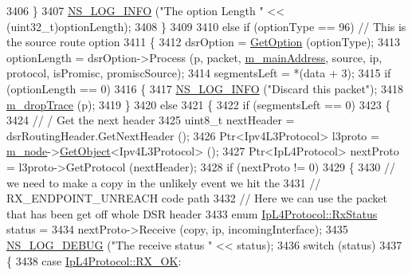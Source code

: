 \begin{DoxyCode}
3406         \}
3407       \hyperlink{group__logging_gafbd73ee2cf9f26b319f49086d8e860fb}{NS\_LOG\_INFO} (\textcolor{stringliteral}{"The option Length "} << (uint32\_t)optionLength);
3408     \}
3409 
3410   \textcolor{keywordflow}{else} \textcolor{keywordflow}{if} (optionType == 96)       \textcolor{comment}{// This is the source route option}
3411     \{
3412       dsrOption = \hyperlink{classns3_1_1dsr_1_1DsrRouting_a5cdb4c336831a3158c6ba12d226a198e}{GetOption} (optionType);
3413       optionLength = dsrOption->Process (p, packet, \hyperlink{classns3_1_1dsr_1_1DsrRouting_a73182b5edee2d8460f28855e058fc9a0}{m\_mainAddress}, source, ip, protocol, 
      isPromisc, promiscSource);
3414       segmentsLeft = *(data + 3);
3415       \textcolor{keywordflow}{if} (optionLength == 0)
3416         \{
3417           \hyperlink{group__logging_gafbd73ee2cf9f26b319f49086d8e860fb}{NS\_LOG\_INFO} (\textcolor{stringliteral}{"Discard this packet"});
3418           \hyperlink{classns3_1_1dsr_1_1DsrRouting_aacee2c8437c0b61579cfa7a420423e03}{m\_dropTrace} (p);
3419         \}
3420       \textcolor{keywordflow}{else}
3421         \{
3422           \textcolor{keywordflow}{if} (segmentsLeft == 0)
3423             \{
3424               \textcolor{comment}{// / Get the next header}
3425               uint8\_t nextHeader = dsrRoutingHeader.GetNextHeader ();
3426               Ptr<Ipv4L3Protocol> l3proto = \hyperlink{classns3_1_1dsr_1_1DsrRouting_ac27df0103a40973f0a3f78af0092c60d}{m\_node}->\hyperlink{classns3_1_1Object_a13e18c00017096c8381eb651d5bd0783}{GetObject}<Ipv4L3Protocol> ();
3427               Ptr<IpL4Protocol> nextProto = l3proto->GetProtocol (nextHeader);
3428               \textcolor{keywordflow}{if} (nextProto != 0)
3429                 \{
3430                   \textcolor{comment}{// we need to make a copy in the unlikely event we hit the}
3431                   \textcolor{comment}{// RX\_ENDPOINT\_UNREACH code path}
3432                   \textcolor{comment}{// Here we can use the packet that has been get off whole DSR header}
3433                   \textcolor{keyword}{enum} \hyperlink{classns3_1_1IpL4Protocol_afd3744c89902fff232e2fd45f558c80e}{IpL4Protocol::RxStatus} status =
3434                     nextProto->Receive (copy, ip, incomingInterface);
3435                   \hyperlink{group__logging_ga413f1886406d49f59a6a0a89b77b4d0a}{NS\_LOG\_DEBUG} (\textcolor{stringliteral}{"The receive status "} << status);
3436                   \textcolor{keywordflow}{switch} (status)
3437                     \{
3438                     \textcolor{keywordflow}{case} \hyperlink{classns3_1_1IpL4Protocol_afd3744c89902fff232e2fd45f558c80eabd979bce2f3b22521c81c4115c66317e}{IpL4Protocol::RX\_OK}:

\end{DoxyCode}
